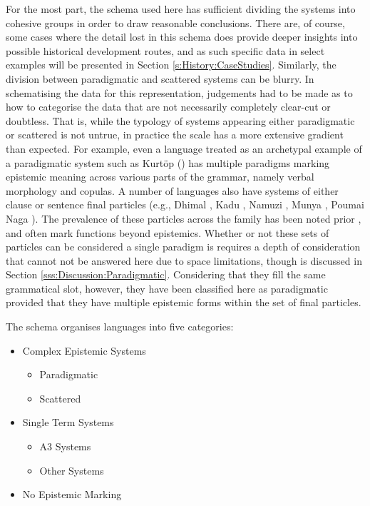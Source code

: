 For the most part, the schema used here has sufficient dividing the systems into cohesive groups in order to draw reasonable conclusions. There are, of course, some cases where the detail lost in this schema does provide deeper insights into possible historical development routes, and as such specific data in select examples will be presented in Section \ref{s:History:CaseStudies}. Similarly, the division between paradigmatic and scattered systems can be blurry. In schematising the data for this representation, judgements had to be made as to how to categorise the data that are not necessarily completely clear-cut or doubtless. That is, while the typology of systems appearing either paradigmatic or scattered is not untrue, in practice the scale has a more extensive gradient than expected. For example, even a language treated as an archetypal example of a paradigmatic system such as Kurtöp (\cite[East Bodish: Bhutan, ][]{Hyslop2020Kurtop}) has multiple paradigms marking epistemic meaning across various parts of the grammar, namely verbal morphology and copulas. A number of languages also have systems of either clause or sentence final particles (e.g., Dhimal \cite{King2009}, Kadu \cite{Sangdong2012}, Namuzi \cite{Pavlik2017}, Munya \cite{Bai2019}, Poumai Naga \cite{Veikho2021}). The prevalence of these particles across the family has been noted prior \cite{DeLancey2011}, and often mark functions beyond epistemics. Whether or not these sets of particles can be considered a single paradigm is requires a depth of consideration that cannot not be answered here due to space limitations, though is discussed in Section \ref{sss:Discussion:Paradigmatic}. Considering that they fill the same grammatical slot, however, they have been classified here as paradigmatic provided that they have multiple epistemic forms within the set of final particles.

The schema organises languages into five categories:
\begin{itemize}
    \item Complex Epistemic Systems
    \begin{itemize}
        \item Paradigmatic
        \item Scattered
    \end{itemize}
    \item Single Term Systems
    \begin{itemize}
        \item A3 Systems
        \item Other Systems
    \end{itemize}
    \item No Epistemic Marking
\end{itemize}
